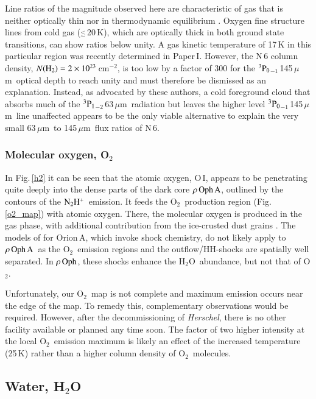 \documentclass{aa}
\newcommand{\cmtwo}{cm$^{-2}$}
\newcommand{\um}{$\mu$m}                                 %
\newcommand{\water}{H$_{2}$O}
\newcommand{\molo}{O$_{2}$}                     %
\newcommand{\lapprox}{$\stackrel {<}{_{\sim}}$}
\newcommand{\pzero}{$^{3}{\rm P}_{0}$}
\newcommand{\pone}{$^{3}{\rm P}_{1}$}
\newcommand{\ntwohp}{${\rm N_2H^+}$}
\newcommand{\ro}{$\rho \, {\rm Oph}$}
\newcommand{\roa}{$\rho \, {\rm Oph \, A}$}
\begin{document}
Line ratios of the magnitude observed here are characteristic of gas that is neither optically thin nor in thermodynamic equilibrium \citep[e.g.][]{liseau2006,canning2016}. Oxygen fine structure lines from cold gas (\lapprox\,20\,K), which are  optically thick in both ground state transitions, can show ratios below unity. A gas kinetic temperature of 17\,K in this particular region was recently determined  in Paper\,I. However, the N\,6 column density, $N({\rm H}_2)=2\times 10^{23}$\,\cmtwo, is too low by a factor of 300 for the \pzero$_{-1}$\,145\,\um\ optical depth to reach unity \citep[see][]{liseau2006} and must therefore be dismissed as an explanation. Instead, as advocated by these authors, a cold foreground cloud that absorbs much of the \pone$_{-2}$\,63\,\um\ radiation but leaves the higher level \pzero$_{-1}$\,145\,\um\ line unaffected appears to be the only viable alternative to explain the very small 63\,\um\ to 145\,\um\ flux ratios of N\,6.


\subsubsection{Molecular oxygen, \molo}

In Fig.\,\ref{h2} it can be seen that the atomic oxygen, O\,I, appears to be penetrating quite deeply into the dense parts of the dark core \roa, outlined by the contours of the \ntwohp\ emission. It feeds the \molo\ production region (Fig.\,\ref{o2_map}) with atomic oxygen. There, the molecular oxygen is produced in the gas phase, with additional contribution from the ice-crusted dust grains \citep{hollenbach2009}. The models of \citet{melnick2015} for Orion\,A, which invoke shock chemistry, do not likely  apply to \roa\ as the \molo\ emission regions and the outflow/HH-shocks are spatially well separated. In \ro, these shocks enhance the \water\ abundance, but not that of \molo. 

Unfortunately, our \molo\ map is not complete and maximum emission occurs near the edge of the map. To remedy this, complementary observations would be required. However, after the decommissioning of {\it Herschel}, there is no other facility available or planned any time soon. The factor of two higher intensity at the local \molo\  emission maximum is likely an effect of the increased temperature (25\,K) rather than a higher column density of \molo\ molecules.


\subsection{Water, \water}
\end{document}
